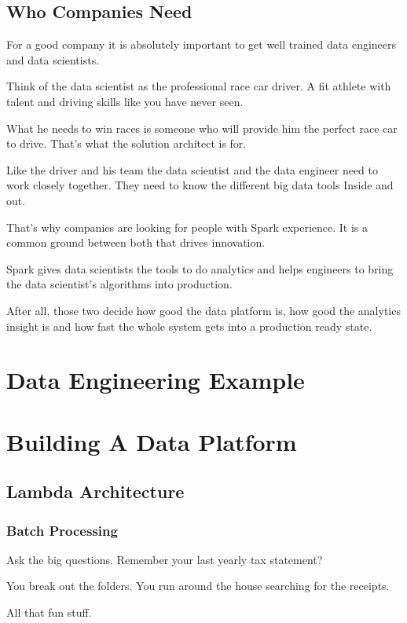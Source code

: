 \documentclass[12pt]{scrartcl} %
\begin{document}
\subsection{Who Companies Need}
For a good company it is absolutely important to get well trained data engineers and data scientists.

Think of the data scientist as the professional race car driver. A fit athlete with talent and driving skills like you have never seen.

What he needs to win races is someone who will provide him the perfect race car to drive. That’s what the solution architect is for.

Like the driver and his team the data scientist and the data engineer need to work closely together. They need to know the different big data tools Inside and out.

That's why companies are looking for people with Spark experience. It is a common ground between both that drives innovation.

Spark gives data scientists the tools to do analytics and helps engineers to bring the data scientist’s algorithms into production.

After all, those two decide how good the data platform is, how good the analytics insight is and how fast the whole system gets into a production ready state.

\section{Data Engineering Example}

\section{Building A Data Platform}

\subsection{ Lambda Architecture}

\subsubsection{Batch Processing} Ask the big questions. Remember your last yearly tax statement?

You break out the folders. You run around the house searching for the receipts.

All that fun stuff.
\end{document}
